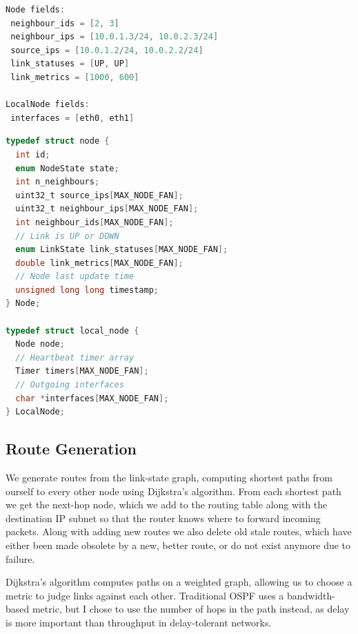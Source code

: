\documentclass[withindex,glossary,openany]{cam-thesis}
\begin{document}
\begin{minipage}{1\textwidth} \centering
\begin{lstlisting}[language=C, label=node_ex_listing, frame=tb, columns=fullflexible, caption=Psuedocode for some fields of \texttt{Node} and \texttt{LocalNode} filled in node \texttt{n1}.]
Node fields:
 neighbour_ids = [2, 3]
 neighbour_ips = [10.0.1.3/24, 10.0.2.3/24]
 source_ips = [10.0.1.2/24, 10.0.2.2/24]
 link_statuses = [UP, UP]
 link_metrics = [1000, 600]

LocalNode fields:
 interfaces = [eth0, eth1]
\end{lstlisting}
\end{minipage}

\begin{minipage}{1\textwidth} \centering
\begin{lstlisting}[language=C, label=node_data_structs, frame=tb, columns=fullflexible, caption=C source code for \texttt{Node} and \texttt{LocalNode} data structures.]
typedef struct node {
  int id;
  enum NodeState state;
  int n_neighbours;
  uint32_t source_ips[MAX_NODE_FAN];
  uint32_t neighbour_ips[MAX_NODE_FAN];
  int neighbour_ids[MAX_NODE_FAN];
  // Link is UP or DOWN
  enum LinkState link_statuses[MAX_NODE_FAN];
  double link_metrics[MAX_NODE_FAN];
  // Node last update time
  unsigned long long timestamp;
} Node;

typedef struct local_node {
  Node node;
  // Heartbeat timer array
  Timer timers[MAX_NODE_FAN];
  // Outgoing interfaces
  char *interfaces[MAX_NODE_FAN];
} LocalNode;
\end{lstlisting}
\end{minipage}

\subsection{Route Generation}

We generate routes from the link-state graph, computing shortest paths from ourself to every other node using Dijkstra's algorithm. From each shortest path we get the next-hop node, which we add to the routing table along with the destination IP subnet so that the router knows where to forward incoming packets. Along with adding new routes we also delete old stale routes, which have either been made obsolete by a new, better route, or do not exist anymore due to failure.

Dijkstra's algorithm computes paths on a weighted graph, allowing us to choose a metric to judge links against each other. Traditional OSPF uses a bandwidth-based metric, but I chose to use the number of hops in the path instead, as delay is more important than throughput in delay-tolerant networks.
\end{document}
